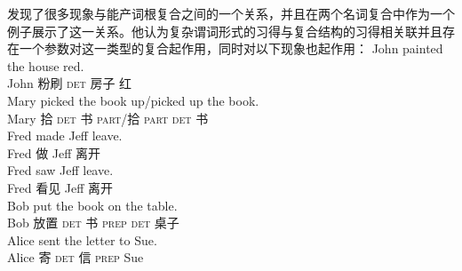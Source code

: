 \citet{Snyder2001a}发现了很多现象与能产词根复合之间的一个关系，并且在两个名词复合中作为一个例子展示了这一关系。他认为复杂谓词形式的习得与复合结构的习得相关联并且存在一个参数对这一类型的复合起作用，同时对以下现象也起作用：
\eal\settowidth{}
\ex 
\gll John painted the house red. \\
     John 粉刷 \textsc{det} 房子 红\\              
\ex 
\gll Mary picked the book up/picked up the book. \\           
     Mary 拾 \textsc{det} 书 \textsc{part}/拾 \textsc{part} \textsc{det} 书\\ 
\ex 
\gll Fred made Jeff leave. \\
    Fred 做 Jeff 离开\\              
\ex 
\gll Fred saw Jeff leave.\\ 
    Fred 看见 Jeff 离开\\             
\ex 
\gll Bob put the book on the table. \\
    Bob 放置 \textsc{det} 书 \textsc{prep} \textsc{det} 桌子\\               
\ex 
\gll Alice sent the letter to Sue.  \\
    Alice 寄 \textsc{det} 信 \textsc{prep} Sue\\             
